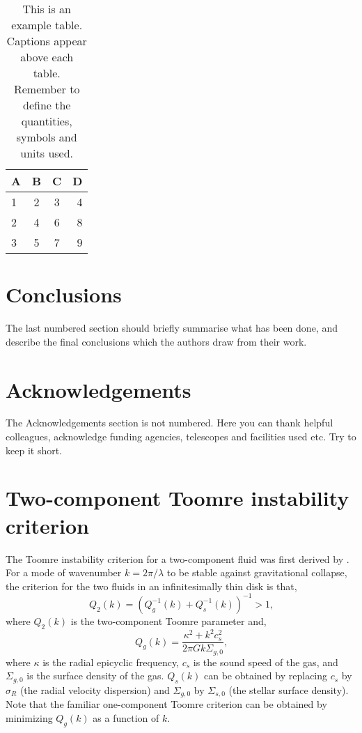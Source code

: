 \documentclass[a4paper,fleqn,usenatbib]{mnras}
\newcommand{\beq}{\begin{equation}}
\newcommand{\eeq}{\end{equation}}
\begin{document}
\begin{table}
	\centering
	\caption{This is an example table. Captions appear above each table.
	Remember to define the quantities, symbols and units used.}
	\label{tab:example_table}
	\begin{tabular}{lccr} %
		\hline
		A & B & C & D\\
		\hline
		1 & 2 & 3 & 4\\
		2 & 4 & 6 & 8\\
		3 & 5 & 7 & 9\\
		\hline
	\end{tabular}
\end{table}


\section{Conclusions}

The last numbered section should briefly summarise what has been done, and describe
the final conclusions which the authors draw from their work.

\section*{Acknowledgements}

The Acknowledgements section is not numbered. Here you can thank helpful
colleagues, acknowledge funding agencies, telescopes and facilities used etc.
Try to keep it short.






\appendix

\section{Two-component Toomre instability criterion}
The Toomre instability criterion for a two-component fluid was first derived
by \citet{1984ApJ...276..114J}. For a mode of wavenumber $k=2\pi/\lambda$ to
be stable against gravitational collapse, the criterion for the two fluids in
an infinitesimally thin disk is that,
\beq
Q_2(k) = \left(Q_g^{-1}(k) + Q_s^{-1}(k) \right)^{-1} > 1\text{,}
\eeq
where $Q_2(k)$ is the two-component Toomre parameter and,
\beq
Q_g(k) = \frac{\kappa^2 + k^2 c_s^2}{2\pi G k \Sigma_{g,0}}\text{,}
\eeq
where $\kappa$ is the radial epicyclic frequency, $c_s$ is the sound speed of
the gas, and $\Sigma_{g,0}$ is the surface density of the gas. $Q_s(k)$ can be
obtained by replacing $c_s$ by $\sigma_R$ (the radial velocity dispersion) and
$\Sigma_{g,0}$ by $\Sigma_{s,0}$ (the stellar surface density). Note that the
familiar one-component Toomre criterion can be obtained by minimizing $Q_g(k)$
as a function of $k$.
\end{document}
